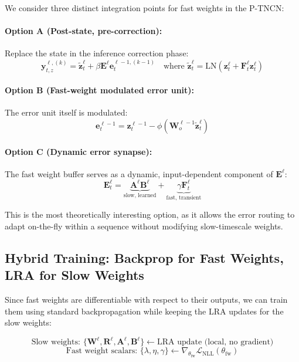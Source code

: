\documentclass[11pt]{article}
\theoremstyle{definition}
\newcommand{\vz}{\mathbf{z}}
\newcommand{\vy}{\mathbf{y}}
\newcommand{\ve}{\mathbf{e}}
\newcommand{\W}{\mathbf{W}}
\newcommand{\R}{\mathbf{R}}
\newcommand{\E}{\mathbf{E}}
\newcommand{\A}{\mathbf{A}}
\newcommand{\B}{\mathbf{B}}
\begin{document}
We consider three distinct integration points for fast weights in the P-TNCN:

\paragraph{Option A (Post-state, pre-correction):}
Replace the state in the inference correction phase:
\begin{equation}
  \vy^{\ell,(k)}_{t,z} = \tilde{\vz}^\ell_t + \beta \E^\ell \ve^{\ell-1,(k-1)}_t
  \quad \text{where } \tilde{\vz}^\ell_t = \mathrm{LN}(\vz^\ell_t + \mathbf{F}^\ell_t \vz^\ell_t)
\end{equation}

\paragraph{Option B (Fast-weight modulated error unit):}
The error unit itself is modulated:
\begin{equation}
  \ve^{\ell-1}_t = \vz^{\ell-1}_t - \phi\!\left(\W^{\ell-1}_o \tilde{\vz}^\ell_t\right)
\end{equation}

\paragraph{Option C (Dynamic error synapse):}
The fast weight buffer serves as a dynamic, input-dependent component of $\E^\ell$:
\begin{equation}
  \E^\ell_t = \underbrace{\A^\ell \B^\ell}_{\text{slow, learned}} + \underbrace{\gamma \mathbf{F}^\ell_t}_{\text{fast, transient}}
\end{equation}

This is the most theoretically interesting option, as it allows the error routing
to adapt on-the-fly within a sequence without modifying slow-timescale weights.

\subsection{Hybrid Training: Backprop for Fast Weights, LRA for Slow Weights}

Since fast weights are differentiable with respect to their outputs, we can train them
using standard backpropagation while keeping the LRA updates for the slow weights:

\begin{equation}
  \text{Slow weights: } \{\W^\ell, \R^\ell, \A^\ell, \B^\ell\} \leftarrow \text{LRA update (local, no gradient)}
\end{equation}
\begin{equation}
  \text{Fast weight scalars: } \{\lambda, \eta, \gamma\} \leftarrow \nabla_{\theta_\text{fw}} \mathcal{L}_\text{NLL}(\theta_\text{fw})
\end{equation}
\end{document}
